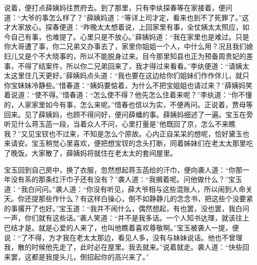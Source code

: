 \begin{parag}
    说着，便打点薛姨妈往贾府去。到了那里，只有李纨探春等在家接着，便问道：“大爷的事怎么样了？”薛姨妈道：“等详上司才定，看来也到不了死罪了。”这才大家放心。探春便道：“昨晚太太想着说，上回家里有事，全仗姨太太照应，如今自己有事，也难提了。心里只是不放心。”薛姨妈道：“我在家里也是难过。只是你大哥遭了事，你二兄弟又办事去了，家里你姐姐一个人，中什么用？况且我们媳妇儿又是个不大晓事的，所以不能脱身过来。目今那里知县也正为预备周贵妃的差事，不得了结案件，所以你二兄弟回来了，我才得过来看看。”李纨便道：“请姨太太这里住几天更好。”薛姨妈点头道：“我也要在这边给你们姐妹们作作伴儿，就只你宝妹妹冷静些。”惜春道：“姨妈要惦着，为什么不把宝姐姐也请过来？”薛姨妈笑着说道：“使不得。”惜春道：“怎么使不得？他先怎么住着来呢？”李纨道：“你不懂的，人家家里如今有事，怎么来呢。”惜春也信以为实，不便再问。正说着，贾母等回来。见了薛姨妈，也顾不得问好，便问薛蟠的事。薛姨妈细述了一遍。宝玉在旁听见什么蒋玉菡一段，当着众人不问，心里打量是”他既回了京，怎么不来瞧我？”又见宝钗也不过来，不知是怎么个原故。心内正自呆呆的想呢，恰好黛玉也来请安。宝玉稍觉心里喜欢，便把想宝钗的念头打断，同着姊妹们在老太太那里吃了晚饭。大家散了，薛姨妈将就住在老太太的套间屋里。
\end{parag}


\begin{parag}
    宝玉回到自己房中，换了衣服，忽然想起蒋玉菡给的汗巾，便向袭人道：“你那一年没有系的那条红汗巾子还有没有？”袭人道：“我搁着呢。问他做什么？”宝玉道：“我白问问。”袭人道：“你没有听见，薛大爷相与这些混账人，所以闹到人命关天。你还提那些作什么？有这样白操心，倒不如静静儿的念念书，把这些个没要紧的事撂开了也好。”宝玉道：“我并不闹什么，偶然想起，有也罢，没也罢，我白问一声，你们就有这些话。”袭人笑道：“并不是我多话。一个人知书达理，就该往上巴结才是。就是心爱的人来了，也叫他瞧着喜欢尊敬啊。”宝玉被袭人一提，便说：“了不得，方才我在老太太那边，看见人多，没有与妹妹说话。他也不曾理我，散的时候他先走了，此时必在屋里。我去就来。”说着就走。袭人道：“快些回来罢，这都是我提头儿，倒招起你的高兴来了。”
\end{parag}


